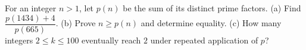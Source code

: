 For an integer $n>1$, let $p(n)$ be the sum of its distinct prime factors. (a) Find $\dfrac{p(1434)+4}{p(665)}$. (b) Prove $n\ge p(n)$ and determine equality. (c) How many integers $2\le k\le100$ eventually reach $2$ under repeated application of $p$?
